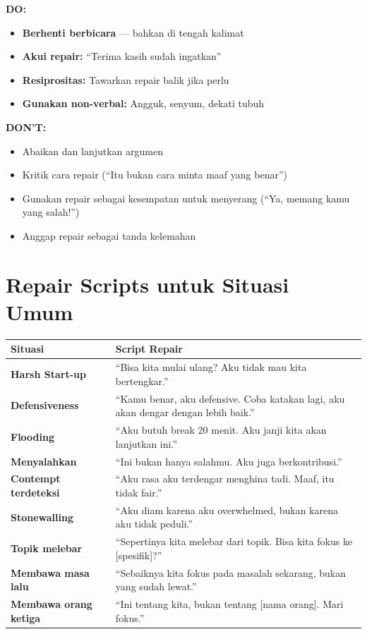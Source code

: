 \begin{tipbox}
\textbf{DO:}
\begin{itemize}
    \item \textbf{Berhenti berbicara} --- bahkan di tengah kalimat
    \item \textbf{Akui repair:} ``Terima kasih sudah ingatkan''
    \item \textbf{Resiprositas:} Tawarkan repair balik jika perlu
    \item \textbf{Gunakan non-verbal:} Angguk, senyum, dekati tubuh
\end{itemize}

\textbf{DON'T:}
\begin{itemize}
    \item Abaikan dan lanjutkan argumen
    \item Kritik cara repair (``Itu bukan cara minta maaf yang benar'')
    \item Gunakan repair sebagai kesempatan untuk menyerang (``Ya, memang kamu yang salah!'')
    \item Anggap repair sebagai tanda kelemahan
\end{itemize}
\end{tipbox}

\section{Repair Scripts untuk Situasi Umum}

\begin{center}
\renewcommand{\arraystretch}{1.8}
\begin{tabular}{|>{\raggedright}p{4cm}|>{\raggedright\arraybackslash}p{11cm}|}
\hline
\rowcolor{sagegreen!20}
\textbf{Situasi} & \textbf{Script Repair} \\
\hline
\textbf{Harsh Start-up} & ``Bisa kita mulai ulang? Aku tidak mau kita bertengkar.'' \\
\hline
\textbf{Defensiveness} & ``Kamu benar, aku defensive. Coba katakan lagi, aku akan dengar dengan lebih baik.'' \\
\hline
\textbf{Flooding} & ``Aku butuh break 20 menit. Aku janji kita akan lanjutkan ini.'' \\
\hline
\textbf{Menyalahkan} & ``Ini bukan hanya salahmu. Aku juga berkontribusi.'' \\
\hline
\textbf{Contempt terdeteksi} & ``Aku rasa aku terdengar menghina tadi. Maaf, itu tidak fair.'' \\
\hline
\textbf{Stonewalling} & ``Aku diam karena aku overwhelmed, bukan karena aku tidak peduli.'' \\
\hline
\textbf{Topik melebar} & ``Sepertinya kita melebar dari topik. Bisa kita fokus ke [spesifik]?'' \\
\hline
\textbf{Membawa masa lalu} & ``Sebaiknya kita fokus pada masalah sekarang, bukan yang sudah lewat.'' \\
\hline
\textbf{Membawa orang ketiga} & ``Ini tentang kita, bukan tentang [nama orang]. Mari fokus.'' \\
\hline
\end{tabular}
\end{center}

